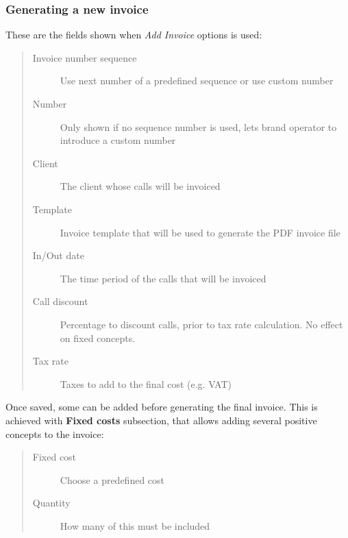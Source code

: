 \documentclass[letterpaper,10pt,english]{sphinxmanual}
\begin{document}
\subsubsection{Generating a new invoice}
\label{administration_portal/brand/invoicing/invoices:generating-a-new-invoice}
These are the fields shown when \emph{Add Invoice} options is used:
\begin{quote}
\begin{description}
\item[{Invoice number sequence}] \leavevmode
Use next number of a predefined sequence or use custom number

\item[{Number}] \leavevmode
Only shown if no sequence number is used, lets brand operator to introduce a custom number

\item[{Client}] \leavevmode
The client whose calls will be invoiced

\item[{Template}] \leavevmode
Invoice template that will be used to generate the PDF invoice file

\item[{In/Out date}] \leavevmode
The time period of the calls that will be invoiced

\item[{Call discount}] \leavevmode
Percentage to discount calls, prior to tax rate calculation. No effect on fixed concepts.

\item[{Tax rate}] \leavevmode
Taxes to add to the final cost (e.g. VAT)

\end{description}
\end{quote}

Once saved, some {\hyperref[administration_portal/brand/invoicing/fixed_costs:fixed\string-costs]{}} can be added before generating the final invoice. This is achieved with \textbf{Fixed costs}
subsection, that allows adding several positive concepts to the invoice:
\begin{quote}
\begin{description}
\item[{Fixed cost}] \leavevmode
Choose a predefined cost

\item[{Quantity}] \leavevmode
How many of this must be included

\end{description}
\end{quote}
\end{document}
